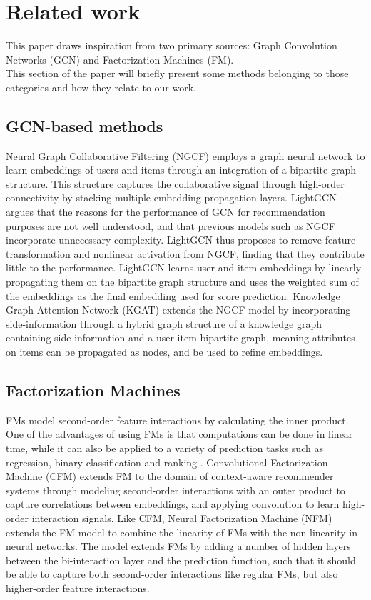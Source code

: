 \section{Related work}\label{sec:relatedwork}
This paper draws inspiration from two primary sources: Graph Convolution Networks (GCN) and Factorization Machines (FM).\\
This section of the paper will briefly present some methods belonging to those categories and how they relate to our work.

\subsection{GCN-based methods}
Neural Graph Collaborative Filtering (NGCF) \cite{NGCF} employs a graph neural network to learn embeddings of users and items through an integration of a bipartite graph structure.
This structure captures the collaborative signal through high-order connectivity by stacking multiple embedding propagation layers.
LightGCN \cite{LightGCN} argues that the reasons for the performance of GCN for recommendation purposes are not well understood, and that previous models such as NGCF incorporate unnecessary complexity.
LightGCN thus proposes to remove feature transformation and nonlinear activation from NGCF, finding that they contribute little to the performance.
LightGCN learns user and item embeddings by linearly propagating them on the bipartite graph structure and uses the weighted sum of the embeddings as the final embedding used for score prediction.
Knowledge Graph Attention Network (KGAT) \cite{KGAT} extends the NGCF model by incorporating side-information through a hybrid graph structure of a knowledge graph containing side-information and a user-item bipartite graph, meaning attributes on items can be propagated as nodes, and be used to refine embeddings.

\subsection{Factorization Machines}
FMs \cite{fmrendle} model second-order feature interactions by calculating the inner product.
One of the advantages of using FMs is that computations can be done in linear time, while it can also be applied to a variety of prediction tasks such as regression, binary classification and ranking \cite{fmrendle}.
Convolutional Factorization Machine (CFM) \cite{CFM} extends FM to the domain of context-aware recommender systems through modeling second-order interactions with an outer product to capture correlations between embeddings, and applying convolution to learn high-order interaction signals.
Like CFM, Neural Factorization Machine (NFM) \cite{NeuralFM} extends the FM model to combine the linearity of FMs with the non-linearity in neural networks.
The model extends FMs by adding a number of hidden layers between the bi-interaction layer and the prediction function, such that it should be able to capture both second-order interactions like regular FMs, but also higher-order feature interactions. 

